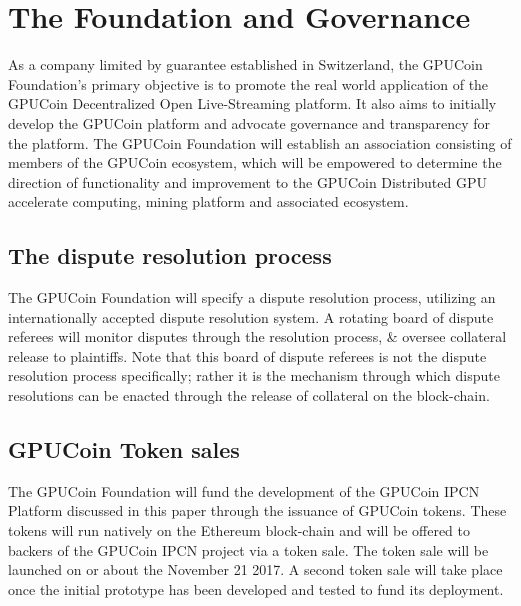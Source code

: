 \documentclass{article}
\begin{document}

\fi


\section{The Foundation and Governance} %
\label{sec:the_foundation_and_governance}
As a company limited by guarantee established in Switzerland, the GPUCoin Foundation's primary objective is to promote the real world application of the GPUCoin Decentralized Open Live-Streaming platform. It also aims to initially develop the GPUCoin platform and advocate governance and transparency for the platform. The GPUCoin Foundation will establish an association consisting of members of the GPUCoin ecosystem, which will be empowered to determine the direction of functionality and improvement to the GPUCoin Distributed GPU accelerate computing, mining platform and associated ecosystem.

\subsection{The dispute resolution process} %
\label{sub:the_dispute_resolution_process}
The GPUCoin Foundation will specify a dispute resolution process, utilizing an internationally accepted dispute resolution system. A rotating board of dispute referees will monitor disputes through the resolution process, \& oversee collateral release to plaintiffs. Note that this board of dispute referees is not the dispute resolution process specifically; rather it is the mechanism through which dispute resolutions can be enacted through the release of collateral on the block-chain.


\subsection{GPUCoin Token sales} %
\label{sub:hoot_token_sales}
The GPUCoin Foundation will fund the development of the GPUCoin IPCN Platform discussed in this paper through the issuance of GPUCoin tokens. These tokens will run natively on the Ethereum block-chain and will be offered to backers of the GPUCoin IPCN project via a token sale. The token sale will be launched on or about the November 21 2017. A second token sale will take place once the initial prototype has been developed and tested to fund its deployment. 

\end{document}

